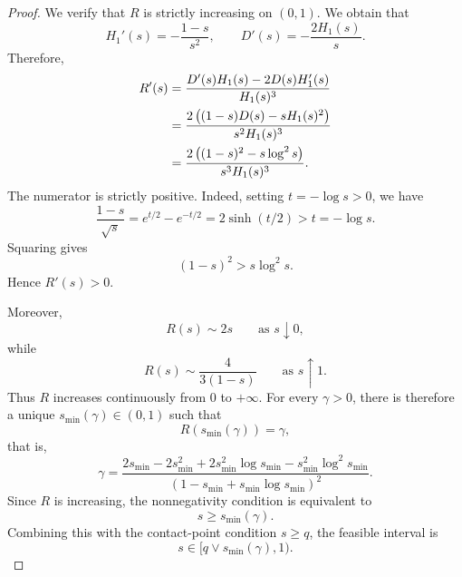 \documentclass[10pt,a4paper]{amsart}
\newcommand{\comp}{\gamma}
\begin{document}
\begin{proof}
We verify that $R$ is strictly increasing on $(0,1)$. We obtain that
\begin{equation*}
    H_1'(s)
    =
    -\frac{1-s}{s^2},
    \qquad
    D'(s)
    =
    -\frac{2H_1(s)}s.
\end{equation*}
Therefore,
\begin{align}
    R'(s)
    &=
    \frac{
        D'(s)H_1(s)-2D(s)H_1'(s)
    }{
        H_1(s)^3
    }\notag\\
    &=
    \frac{
        2\left((1-s)D(s)-sH_1(s)^2\right)
    }{
        s^2H_1(s)^3
    }\notag\\
    &=
    \frac{
        2\left((1-s)^2-s\log^2s\right)
    }{
        s^3H_1(s)^3
    }.
    \label{eq:iid_R_derivative}
\end{align}
The numerator is strictly positive. Indeed, setting
$t=-\log s>0$, we have
\begin{equation*}
    \frac{1-s}{\sqrt{s}}
    =
    e^{t/2}-e^{-t/2}
    =
    2\sinh(t/2)
    >
    t
    =
    -\log s.
\end{equation*}
Squaring gives
\begin{equation*}
    (1-s)^2>s\log^2s.
\end{equation*}
Hence $R'(s)>0$.

Moreover,
\begin{equation*}
    R(s)\sim2s
    \qquad\text{as }s\downarrow0,
\end{equation*}
while
\begin{equation*}
    R(s)\sim\frac{4}{3(1-s)}
    \qquad\text{as }s\uparrow1.
\end{equation*}
Thus $R$ increases continuously from $0$ to $+\infty$. For every
$\comp>0$, there is therefore a unique
$s_{\min}(\comp)\in(0,1)$ such that
\begin{equation*}
    R(s_{\min}(\comp))=\comp,
\end{equation*}
that is,
\begin{equation}\label{eq:iid_smin_detailed}
    \comp
    =
    \frac{
        2s_{\min}-2s_{\min}^2
        +2s_{\min}^2\log s_{\min}
        -s_{\min}^2\log^2s_{\min}
    }{
        \left(
            1-s_{\min}+s_{\min}\log s_{\min}
        \right)^2
    }.
\end{equation}
Since $R$ is increasing, the nonnegativity condition is equivalent
to
\begin{equation*}
    s\geq s_{\min}(\comp).
\end{equation*}
Combining this with the contact-point condition $s\geq q$, the
feasible interval is
\begin{equation*}
    s\in[q\vee s_{\min}(\comp),1).
\end{equation*}


\end{proof}
\end{document}
